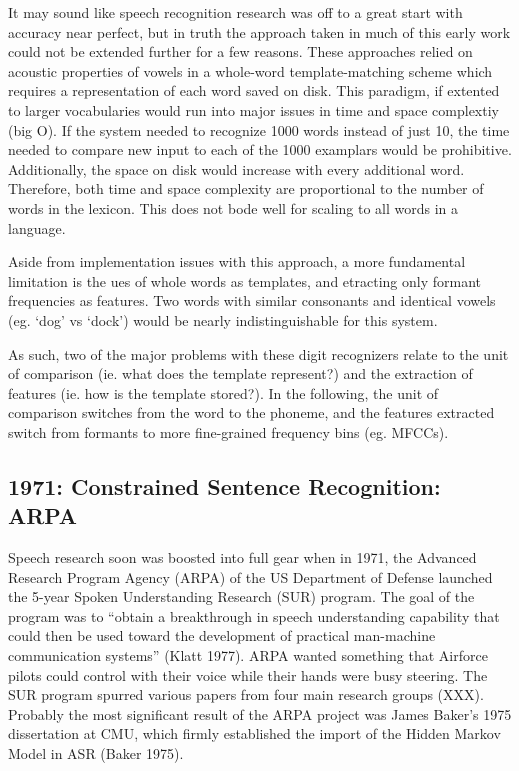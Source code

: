 \documentclass[10pt,a4paper]{article}
\begin{document}
It may sound like speech recognition research was off to a great start with accuracy near perfect, but in truth the approach taken in much of this early work could not be extended further for a few reasons. These approaches relied on acoustic properties of vowels in a whole-word template-matching scheme which requires a representation of each word saved on disk. This paradigm, if extented to larger vocabularies would run into major issues in time and space complextiy (big O). If the system needed to recognize 1000 words instead of just 10, the time needed to compare new input to each of the 1000 examplars would be prohibitive. Additionally, the space on disk would increase with every additional word. Therefore, both time and space complexity are proportional to the number of words in the lexicon. This does not bode well for scaling to all words in a language.

Aside from implementation issues with this approach, a more fundamental limitation is the ues of whole words as templates, and etracting only formant frequencies as features. Two words with similar consonants and identical vowels (eg. `dog' vs `dock') would be nearly indistinguishable for this system.

As such, two of the major problems with these digit recognizers relate to the unit of comparison (ie. what does the template represent?) and the extraction of features (ie. how is the template stored?). In the following, the unit of comparison switches from the word to the phoneme, and the features extracted switch from formants to more fine-grained frequency bins (eg. MFCCs).

\subsection{1971: Constrained Sentence Recognition: ARPA}

 Speech research soon was boosted into full gear when in 1971, the Advanced Research Program Agency (ARPA) of the US Department of Defense launched the 5-year Spoken Understanding Research (SUR) program. The goal of the program was to ``obtain a breakthrough in speech understanding capability that could then be used toward the development of practical man-machine communication systems'' (Klatt 1977). ARPA wanted something that Airforce pilots could control with their voice while their hands were busy steering. The SUR program spurred various papers from four main research groups (XXX). Probably the most significant result of the ARPA project was James Baker's 1975 dissertation at CMU, which firmly established the import of the Hidden Markov Model in ASR (Baker 1975).
\end{document}
